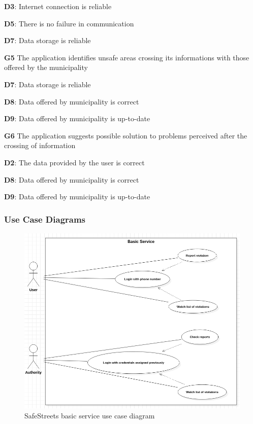 \begin{outline}
\2 \textbf{D3}: Internet connection is reliable

\2 \textbf{D5}: There is no failure in communication

\2 \textbf{D7}: Data storage is reliable


\1  \textbf{G5} The application identifies unsafe areas crossing its informations with those offered by the municipality

\2 \textbf{D7}: Data storage is reliable

\2 \textbf{D8}: Data offered by municipality is correct

\2 \textbf{D9}: Data offered by municipality is up-to-date



\1  \textbf{G6} The application suggests possible solution to problems perceived after the crossing of information

\2 \textbf{D2}: The data provided by the user is correct

\2 \textbf{D8}: Data offered by municipality is correct

\2 \textbf{D9}: Data offered by municipality is up-to-date

\end{outline}

\subsubsection{Use Case Diagrams}
\begin{figure}
[H]
\includegraphics[width=\textwidth]{Images/Diagrams/UseCase1.png}
\caption{\label{fig:UseCase1}SafeStreets basic service use case diagram}

\end{figure}

